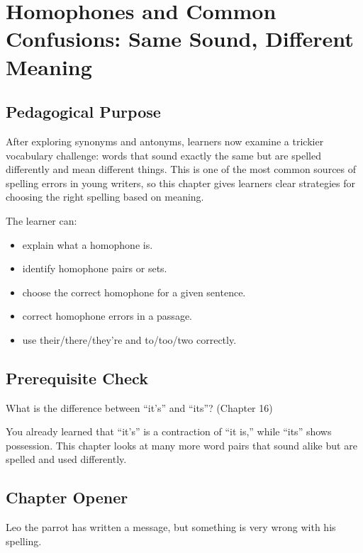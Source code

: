 
\chapter{Homophones and Common Confusions: Same Sound, Different Meaning}

\section{Pedagogical Purpose}
After exploring synonyms and antonyms, learners now examine a trickier vocabulary challenge: words that sound exactly the same but are spelled differently and mean different things. This is one of the most common sources of spelling errors in young writers, so this chapter gives learners clear strategies for choosing the right spelling based on meaning.

\begin{learningobjectives}
The learner can:
\begin{itemize}
    \item explain what a homophone is.
    \item identify homophone pairs or sets.
    \item choose the correct homophone for a given sentence.
    \item correct homophone errors in a passage.
    \item use their/there/they're and to/too/two correctly.
\end{itemize}
\end{learningobjectives}

\section{Prerequisite Check}
\begin{quickcheck}
What is the difference between ``it's'' and ``its''? (Chapter 16)
\end{quickcheck}

\begin{rememberbox}
You already learned that ``it's'' is a contraction of ``it is,'' while ``its'' shows possession. This chapter looks at many more word pairs that sound alike but are spelled and used differently.
\end{rememberbox}

\section{Chapter Opener}
Leo the parrot has written a message, but something is very wrong with his spelling.

